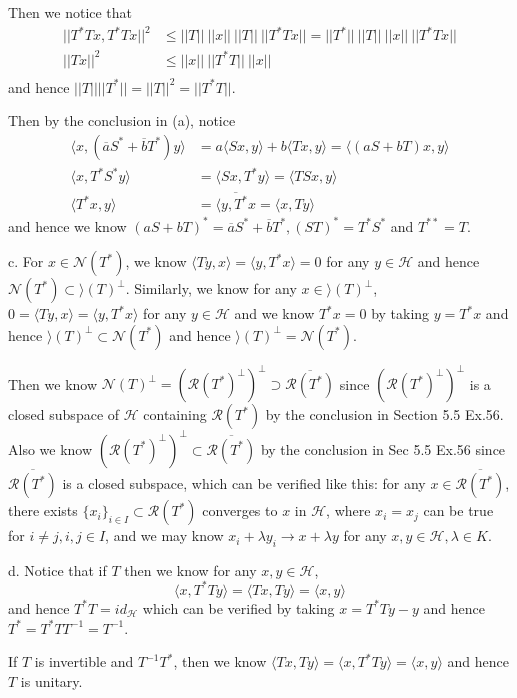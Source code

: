 \documentclass[lang=en,11pt,a4paper,citestyle =authoryear]{elegantpaper}
\newcommand{\Hil}{\mathcal{H}}
\newcommand{\range}{\mathcal{R}}
\newcommand{\nul}{\mathcal{N}}
\begin{document}
Then we notice that
\[\begin{aligned}
    ||T^*Tx, T^*Tx||^2 &\leq ||T||\ ||x||\ ||T||\ ||T^*Tx|| = ||T^*||\ ||T||\ ||x||\ ||T^*Tx|| \\
    ||Tx||^2 &\leq ||x||\ ||T^*T||\ ||x|| \\ 
\end{aligned}\]
and hence $||T||||T^*|| = ||T||^2 = ||T^*T||$.\par
Then by the conclusion in (a), notice
\[
\begin{aligned}
\langle x, (\overline{a}S^* +\overline{b}T^*) y\rangle &= a \langle Sx,y\rangle + b\langle Tx,y\rangle = \langle (aS+bT)x,y\rangle \\
\langle x, T^*S^* y \rangle &= \langle Sx,T^*y\rangle = \langle TSx,y\rangle \\
\langle T^* x,y\rangle &= \overline{\langle y, T^*x} = \langle x,Ty\rangle
\end{aligned}
\]
and hence we know $(aS+bT)^* = \overline{a}S^* + \overline{b}T^{*}, (ST)^* = T^*S^*$ and $T^{**} = T$.\par
c. For $x\in \nul(T^*)$, we know $\langle Ty,x\rangle = \langle y,T^*x\rangle = 0$ for any $y\in\Hil$ and hence $\nul(T^*)\subset \rangle(T)^{\perp}$. Similarly, we know for any $x\in \rangle(T)^{\perp}$, $0 = \langle Ty,x\rangle = \langle y,T^*x \rangle$ for any $y\in\Hil$ and we know $T^* x =0$ by taking $y= T^*x$ and hence $\rangle(T)^{\perp}\subset\nul(T^*)$ and hence $\rangle(T)^{\perp} = \nul(T^*)$.\par
Then we know $\nul(T)^{\perp} = (\range(T^*)^{\perp})^{\perp} \supset \overline{\range(T^*)}$ since $(\range(T^*)^{\perp})^{\perp}$ is a closed subspace of $\Hil$ containing $\range(T^*)$ by the conclusion in Section 5.5 Ex.56. Also we know $(\range(T^*)^{\perp})^{\perp} \subset \overline{\range(T^*)}$ by the conclusion in Sec 5.5 Ex.56 since $\overline{\range(T^*)}$ is a closed subspace, which can be verified like this: for any $x\in \overline{\range(T^*)}$, there exists $\{x_i\}_{i\in I}\subset \range(T^*)$ converges to $x$ in $\Hil$, where $x_i = x_j$ can be true for $i\neq j, i,j\in I$, and we may know $x_i+\lambda y_i \to x+\lambda y$ for any $x,y\in\Hil,\lambda\in K$.\par
d. Notice that if $T$ then we know for any $x,y\in\Hil$,
\[\langle x, T^*Ty\rangle = \langle Tx,Ty\rangle = \langle x,y\rangle\]
and hence $T^*T = id_{\Hil}$ which can be verified by taking $x = T^*Ty-y$ and hence $T^* = T^*TT^{-1} = T^{-1}$.\par
If $T$ is invertible and $T^{-1}T^*$, then we know $\langle Tx,Ty\rangle = \langle x, T^*Ty\rangle = \langle x,y\rangle$ and hence $T$ is unitary.
\vspace{0.5em}
\end{document}
